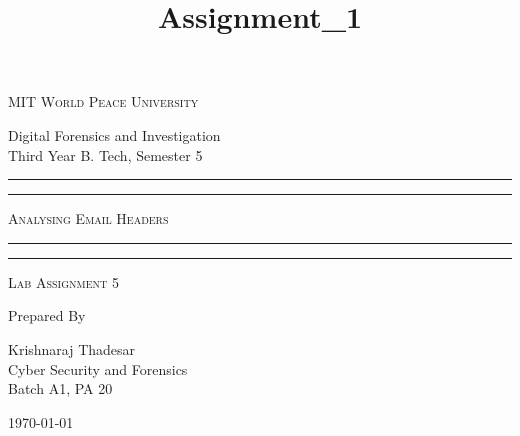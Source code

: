 \documentclass[11pt]{article}
\title{Assignment\_1}
\begin{document}
\begin{titlepage}
    \centering


    \huge\textsc{
        MIT World Peace University
    }\\

    \vspace{0.75\baselineskip} %

    \LARGE{
        Digital Forensics and Investigation\\
        Third Year B. Tech, Semester 5
    }

    \vfill %


    \rule{\textwidth}{1.6pt}\vspace*{-\baselineskip}\vspace*{2pt}
    \rule{\textwidth}{0.6pt}
    \vspace{0.75\baselineskip} %



    \huge{\textsc{
            Analysing Email Headers
        }} \\



    \vspace{0.5\baselineskip} %
    \rule{\textwidth}{0.6pt}\vspace*{-\baselineskip}\vspace*{2.8pt}
    \rule{\textwidth}{1.6pt}

    \vspace{1\baselineskip} %


    \LARGE\textsc{
        Lab Assignment 5
    } %
    \vfill


    Prepared By
    \vspace{0.5\baselineskip} %

    \Large{
        Krishnaraj Thadesar \\
        Cyber Security and Forensics\\
        Batch A1, PA 20
    }


    \vspace{0.5\baselineskip} %
    \today

\end{titlepage}
\end{document}
